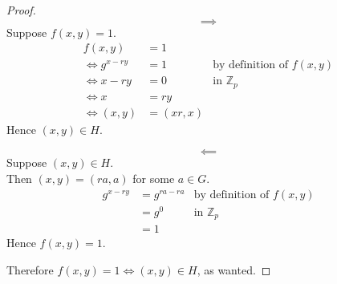 \documentclass{article}
\theoremstyle{plain}
\theoremstyle{centered}
\newcommand{\bb}[1]{\mathbb{#1}}
\begin{document}
        \begin{proof}
                $$\implies$$
                Suppose $f(x,y) = 1$.
                \begin{align*}
                        f(x, y) &= 1\\
                        \iff g^{x - ry} &= 1 & \text{by definition of $f(x, y)$}\\
                        \iff x - ry &= 0 & \text{in $\bb{Z}_p$}\\
                        \iff x &= ry\\
                        \iff (x, y) &= (xr, x)
                \end{align*}
                Hence $(x, y) \in H$.

                $$\impliedby$$
                Suppose $(x, y) \in H$.\\
                Then $(x, y) = (ra, a)$ for some $a \in G$.
                \begin{align*}
                        g^{x - ry} &= g^{ra - ra} & \text{by definition of $f(x, y)$}\\
                        &= g^0 & \text{in $\bb{Z}_p$}\\
                        &= 1
                \end{align*}
                Hence $f(x, y) = 1$.

                Therefore $f(x,y) = 1 \iff (x,y) \in H$, as wanted.
        \end{proof}
\end{document}
